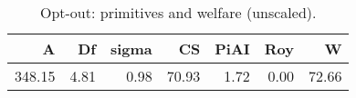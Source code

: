 \begin{table}[!ht]
\centering
\caption{Opt-out: primitives and welfare (unscaled).}
\label{tab:optout}
\begin{tabular}{rrrrrrr}
\toprule
A & Df & sigma & CS & PiAI & Roy & W \\
\midrule
348.15 & 4.81 & 0.98 & 70.93 & 1.72 & 0.00 & 72.66 \\
\bottomrule
\end{tabular}

\end{table}